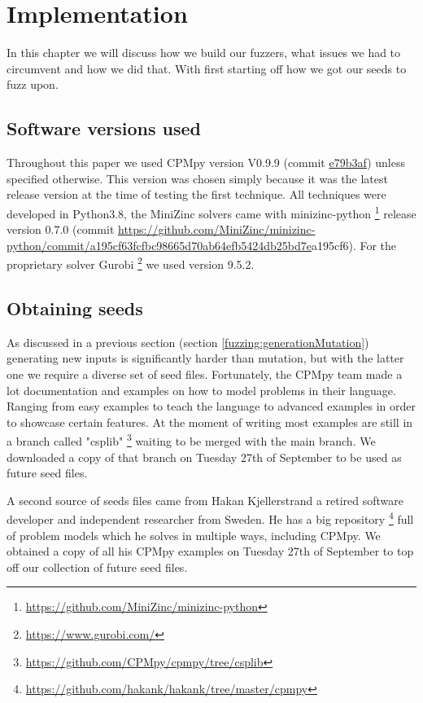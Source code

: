 \chapter{Implementation}
\label{cha:impl}
\label{impl:Intro}
In this chapter we will discuss how we build our fuzzers, what issues we had to circumvent and how we did that. With first starting off how we got our seeds to fuzz upon.

\section{Software versions used}
Throughout this paper we used CPMpy version V0.9.9 (commit \href{https://github.com/CPMpy/cpmpy/commit/e79b3afedc934a9437c2ddb3a9f54d7e2d7bd3ee}{e79b3af}) unless specified otherwise. This version was chosen simply because it was the latest release version at the time of testing the first technique. All techniques were developed in Python3.8, the MiniZinc solvers came with minizinc-python \footnote{\url{https://github.com/MiniZinc/minizinc-python}} release version 0.7.0 (commit \url{https://github.com/MiniZinc/minizinc-python/commit/a195cf63fcfbc98665d70ab64efb5424db25bd7e}{a195cf6}). For the proprietary solver Gurobi \footnote{\url{https://www.gurobi.com/}} we used version 9.5.2.

\section{Obtaining seeds}
\label{impl:obtainingSeeds}
As discussed in a previous section (section \ref{fuzzing:generationMutation}) generating new inputs is significantly harder than mutation, but with the latter one we require a diverse set of seed files. Fortunately, the CPMpy team made a lot documentation and examples on how to model problems in their language. Ranging from easy examples to teach the language to advanced examples in order to showcase certain features. At the moment of writing most examples are still in a branch called "csplib" \footnote{\url{https://github.com/CPMpy/cpmpy/tree/csplib}} waiting to be merged with the main branch. We downloaded a copy of that branch on Tuesday 27th of September to be used as future seed files. 

A second source of seeds files came from Hakan Kjellerstrand a retired software developer and independent researcher from Sweden. He has a big repository \footnote{\url{https://github.com/hakank/hakank/tree/master/cpmpy}} full of problem models which he solves in multiple ways, including CPMpy. We obtained a copy of all his CPMpy examples on Tuesday 27th of September to top off our collection of future seed files.

